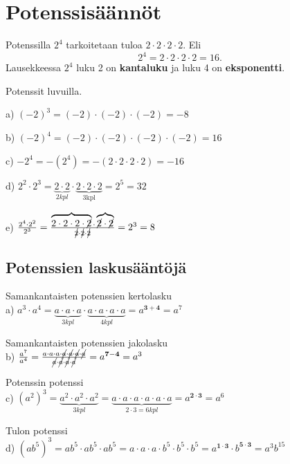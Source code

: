 \chapter{Potenssisäännöt}

Potenssilla $2^4$ tarkoitetaan tuloa $2\cdot 2\cdot 2\cdot 2$. Eli
\begin{equation*}
2^4=2\cdot 2\cdot 2\cdot 2=16.
\end{equation*}
Lausekkeessa $2^4$ luku 2 on \textbf{kantaluku} ja luku 4 on \textbf{eksponentti}.

\begin{esimerkki}
Potenssit luvuilla.

a) $(-2)^3=(-2)\cdot (-2)\cdot (-2)=-8$

b) $(-2)^4=(-2)\cdot (-2)\cdot (-2)\cdot (-2)=16$

c) $-2^4=-(2^4)=-(2\cdot 2\cdot 2\cdot 2)=-16$

d) $2^2\cdot 2^3=\underbrace{2\cdot 2}_{2 kpl}\cdot \underbrace{2\cdot 2\cdot 2}_{3 \text{kpl}}=2^5=32$

e) $\frac{2^4\cdot 2^2}{2^3}=\frac{\overbrace{2\cdot 2\cdot 2\cdot \cancel{2}}\cdot \overbrace{\cancel{2}\cdot \cancel{2}}}{\cancel{2}\cdot \cancel{2}\cdot \cancel{2}}=2^3=8$
\end{esimerkki}

\section*{Potenssien laskusääntöjä}

Samankantaisten potenssien kertolasku\\
a) $a^3\cdot a^4=\underbrace{a\cdot a\cdot a}_{3 kpl}\cdot \underbrace{a\cdot a\cdot a\cdot a}_{4 kpl}=a^{\mathbf{3+4}}=a^7$

Samankantaisten potenssien jakolasku\\
b) $\frac{a^7}{a^4}=\frac{a\cdot a\cdot a\cdot \cancel{a}\cdot \cancel{a}\cdot \cancel{a}\cdot \cancel{a}}{\cancel{a}\cdot \cancel{a}\cdot \cancel{a}\cdot \cancel{a}}=a^{\mathbf{7-4}}=a^3$

Potenssin potenssi\\
c) $(a^2)^3=\underbrace{a^2\cdot a^2\cdot a^2}_{3 kpl}=\underbrace{a\cdot a\cdot a\cdot a\cdot a\cdot a}_{2\cdot 3=6 kpl}=a^{\mathbf{2\cdot 3}}=a^6$

Tulon potenssi\\
d) $(ab^5)^3=ab^5\cdot ab^5\cdot ab^5=a\cdot a\cdot a\cdot b^5\cdot b^5\cdot b^5=a^{\mathbf{1\cdot 3}}\cdot b^{\mathbf{5\cdot 3}}=a^3b^{15}$

